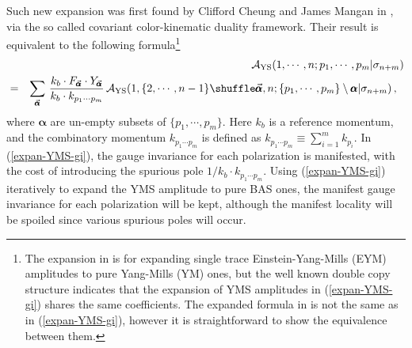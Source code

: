 \documentclass[11pt,a4paper]{article}
\newcommand{\bea}{\begin{eqnarray}}
\newcommand{\eea}{\end{eqnarray}}
\newcommand{\nn}{\nonumber \\}
\def\eref#1{(\ref{#1})}
\def\a{{\alpha}}
\begin{document}
Such new expansion was first found by Clifford Cheung and James Mangan in \cite{Cheung:2021zvb}, via the so called covariant color-kinematic duality framework. Their result is equivalent to the following formula\footnote{The expansion in \cite{Cheung:2021zvb} is for expanding single trace Einstein-Yang-Mills (EYM) amplitudes to pure Yang-Mills (YM) ones, but the well known double copy structure \cite{Kawai:1985xq,Bern:2008qj,Chiodaroli:2014xia,Johansson:2015oia,Johansson:2019dnu}indicates that the expansion of YMS amplitudes in \eref{expan-YMS-gi} shares the same coefficients. The expanded formula in \cite{Cheung:2021zvb} is not the same as in \eref{expan-YMS-gi}, however it is straightforward to show the equivalence between them.}
%
\bea
& &{\cal A}_{\rm YS}(1,\cdots,n;p_1,\cdots,p_m|\sigma_{n+m})\nn
&=&\sum_{\vec{\pmb{\a}}}\,{k_b\cdot F_{\vec{\pmb{\a}}}\cdot Y_{\vec{\pmb{\a}}}\over k_b\cdot k_{p_1\cdots p_m}}\,{\cal A}_{\rm YS}(1,\{2,\cdots,n-1\}\shuffle\vec{\pmb{\a}},n;\{p_1,\cdots,p_m\}\setminus{\pmb{\a}}|\sigma_{n+m})\,,~~\label{expan-YMS-gi}
\eea
%
where $\pmb{\a}$ are un-empty subsets of $\{p_1,\cdots,p_m\}$. Here $k_b$ is a reference momentum, and the combinatory momentum $k_{p_1\cdots p_m}$ is defined as
$k_{p_1\cdots p_m}\equiv \sum_{i=1}^m k_{p_i}$. In \eref{expan-YMS-gi}, the gauge invariance for each polarization is manifested, with the cost of introducing the spurious pole $1/k_b\cdot k_{p_1\cdots p_m}$. Using \eref{expan-YMS-gi} iteratively to expand the YMS amplitude to pure BAS ones, the manifest gauge invariance for each polarization will be kept, although the manifest locality will be spoiled since various spurious poles will occur.
\end{document}
